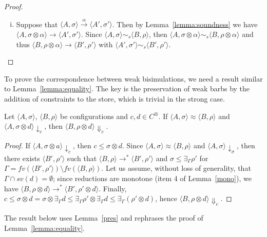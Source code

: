 \documentclass[main.tex]{subfiles}
\begin{document}
\begin{proof}
\begin{description}
\begin{enumerate}[i)]
			\item Suppose that $\langle A, \sigma\rangle \xrightarrow{\;  \alpha \: } \langle A', \sigma' \rangle$.
			Then by Lemma~\ref{lemma:soundness} we have $\langle A, \sigma \otimes \alpha \rangle \rightarrow \langle A', \sigma'\rangle$.
			Since $\langle A, \sigma\rangle \sim_{s} \langle B, \rho\rangle$,
			then  $\langle A, \sigma \otimes \alpha \rangle \sim_{s} \langle B, \rho \otimes \alpha\rangle$ and
			thus $\langle B, \rho \otimes \alpha \rangle \rightarrow \langle B', \rho'\rangle$
			with $\langle A', \sigma'\rangle \sim_{s} \langle B', \rho'\rangle$.
		\end{enumerate}
	\end{description} 
\end{proof}


To prove the correspondence between weak bisimulations, we need a result 
similar to Lemma~\ref{lemma:equality}. The key is the preservation of weak barbs by
the addition of constraints to the store, which is trivial in the strong case.

\begin{lemma}\label{pres}
Let $\langle A, \sigma \rangle$, $\langle B, \rho \rangle$ be configurations and $c, d \in C^\otimes$.
%
If $\langle A, \sigma \rangle \approx \langle B, \rho \rangle$ and $\langle A, \sigma \otimes d \rangle\downarrow_c$, then $\langle B, \rho \otimes d\rangle\Downarrow_c$.
\end{lemma}

\begin{proof}
	If $\langle A, \sigma \otimes a \rangle \downarrow_c$, then $c \leq \sigma \otimes d$. Since $\langle A, \sigma \rangle \approx \langle B, \rho \rangle$ and $\langle A, \sigma \rangle \downarrow_\sigma$,
	then there exists $\langle B', \rho' \rangle$ such that $\langle B, \rho \rangle  \rightarrow^* \langle B', \rho'\rangle$ and $\sigma \leq \exists_\Gamma \rho'$ for $\Gamma = fv(\langle B', \rho'\rangle) \setminus fv(\langle B, \rho\rangle)$.
	Let us assume, without loss of generality, that $\Gamma \cap sv(d) = \emptyset$;
	since reductions are monotone (item 4 of Lemma~\ref{mono}),
	we  have $\langle B, \rho \otimes d \rangle  \rightarrow^* \langle B', \rho' \otimes d\rangle$. 
	Finally, $c \leq \sigma \otimes d = \sigma \otimes \exists_\Gamma d \leq \exists_\Gamma \rho' \otimes \exists_\Gamma d \leq \exists_\Gamma (\rho' \otimes d)$, hence $\langle B, \rho \otimes d\rangle\Downarrow_c$.
\end{proof}

The result below uses Lemma~\ref{pres} and rephrases the proof of Lemma~\ref{lemma:equality}.
\end{document}
